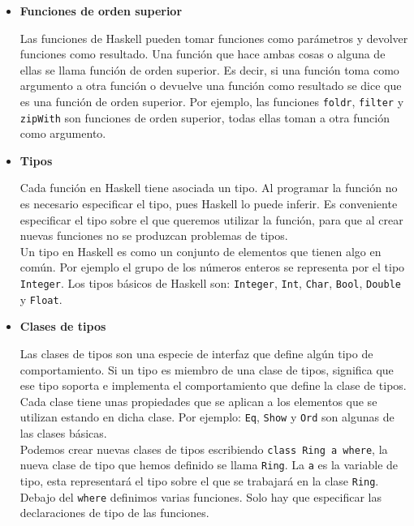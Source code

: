 \begin{itemize}

\item \textbf{Funciones de orden superior}

Las funciones de Haskell pueden tomar funciones como parámetros y devolver funciones como resultado. Una función que hace ambas cosas o alguna de ellas se llama función de orden superior. Es decir, si una función toma como argumento a otra función o devuelve una función como resultado se dice que es una función de orden superior. Por ejemplo, las funciones \texttt{foldr}, \texttt{filter} y \texttt{zipWith} son funciones de orden superior, todas ellas toman a otra función como argumento.\\

\item \textbf{Tipos}

Cada función en Haskell tiene asociada un tipo. Al programar la función no es necesario especificar el tipo, pues Haskell lo puede inferir. Es conveniente especificar el tipo sobre el que queremos utilizar la función, para que al crear nuevas funciones no se produzcan problemas de tipos.\\

Un tipo en Haskell es como un conjunto de elementos que tienen algo en común. Por ejemplo el grupo de los números enteros  se representa por el tipo \texttt{Integer}. Los tipos básicos de Haskell son: \texttt{Integer}, \texttt{Int}, \texttt{Char}, \texttt{Bool}, \texttt{Double} y \texttt{Float}.\\

\item  \textbf{Clases de tipos}

Las clases de tipos son una especie de interfaz que define algún tipo de comportamiento. Si un tipo es miembro de una clase de tipos, significa que ese tipo soporta e implementa el comportamiento que define la clase de tipos. Cada clase tiene unas propiedades que se aplican a los elementos que se utilizan estando en dicha clase. Por ejemplo: \texttt{Eq}, \texttt{Show} y \texttt{Ord} son algunas de las clases básicas.\\

Podemos crear nuevas clases de tipos escribiendo \texttt{class Ring a where}, la nueva clase de tipo que hemos definido se llama \texttt{Ring}. La \texttt{a} es la variable de tipo, esta representará el tipo sobre el que se trabajará en la clase \texttt{Ring}. Debajo del \texttt{where} definimos varias funciones. Solo hay que especificar las declaraciones de tipo de las funciones.\\


\end{itemize}
